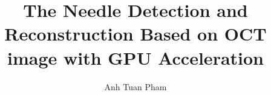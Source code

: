 \documentclass[11pt,a4paper,footexclude,headsepline,footsepline,BCOR12mm,DIV13]{scrbook}
\author{Anh Tuan Pham}
\title{The Needle Detection and Reconstruction Based on OCT image with GPU Acceleration}
\begin{document}

\cleardoublepage




\tableofcontents{}





\end{document}

